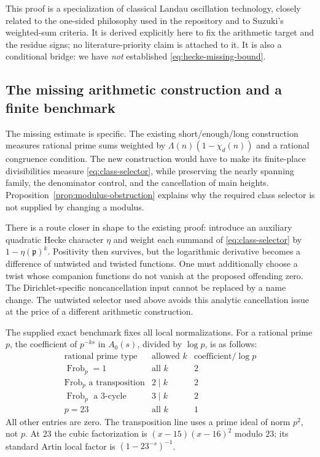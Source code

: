 This proof is a specialization of classical Landau oscillation
technology, closely related to the one-sided philosophy used in the
repository and to Suzuki's weighted-sum criteria.\cite{suzuki,repo}
It is derived explicitly here to fix the arithmetic target and the
residue signs; no literature-priority claim is attached to it. It is
also a conditional bridge: we have \emph{not} established
\eqref{eq:hecke-missing-bound}.

\subsection{The missing arithmetic construction and a finite benchmark}

The missing estimate is specific. The existing short/enough/long
construction measures rational prime sums weighted by
$\Lambda(n)(1-\chi_d(n))$ and a rational congruence condition.
The new construction would have to make its finite-place divisibilities
measure \eqref{eq:class-selector}, while preserving the nearly spanning
family, the denominator control, and the cancellation of main heights.
Proposition~\ref{prop:modulus-obstruction} explains why the required class
selector is not supplied by changing a modulus.

There is a route closer in shape to the existing proof: introduce an
auxiliary quadratic Hecke character $\eta$ and weight each summand of
\eqref{eq:class-selector} by $1-\eta(\mathfrak p)^k$. Positivity then
survives, but the logarithmic derivative becomes a difference of
untwisted and twisted functions. One must additionally choose a twist
whose companion functions do not vanish at the proposed offending
zero. The Dirichlet-specific noncancellation input cannot be replaced
by a name change. The untwisted selector used above avoids this
analytic cancellation issue at the price of a different arithmetic
construction.

The supplied exact benchmark fixes all local normalizations. For a
rational prime $p$, the coefficient of $p^{-ks}$ in $A_0(s)$, divided
by $\log p$, is as follows:
\[
\begin{array}{c|c|c}
 \text{rational prime type}&\text{allowed }k&\text{coefficient}/\log p\\ \hline
 \operatorname{Frob}_p=1&\text{all }k&2\\
 \operatorname{Frob}_p\text{ a transposition}&2\mid k&2\\
 \operatorname{Frob}_p\text{ a }3\text{-cycle}&3\mid k&2\\
 p=23&\text{all }k&1
\end{array}
\]
All other entries are zero. The transposition line uses a prime ideal
of norm $p^2$, not $p$. At $23$ the cubic factorization is
$(x-15)(x-16)^2$ modulo $23$; its standard Artin local factor is
$(1-23^{-s})^{-1}$.

